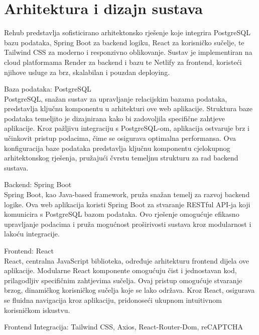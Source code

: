 \chapter{Arhitektura i dizajn sustava}

Rehub predstavlja sofisticirano arhitektonsko rješenje koje integrira PostgreSQL bazu podataka, Spring Boot za backend logiku, React za korisničko sučelje, te Tailwind CSS za moderno i responzivno oblikovanje. Sustav je implementiran na cloud platformama Render za backend i bazu te Netlify za frontend, koristeći njihove usluge za brz, skalabilan i pouzdan deploying.\\

\begin{packed_item}
	\large \item Baza podataka: PostgreSQL \normalsize \\
	PostgreSQL, snažan sustav za upravljanje relacijskim bazama podataka, predstavlja ključnu komponentu u arhitekturi ove web aplikacije. Struktura baze podataka temeljito je dizajnirana kako bi zadovoljila specifične zahtjeve aplikacije. Kroz pažljivu integraciju s PostgreSQL-om, aplikacija ostvaruje brz i učinkovit pristup podacima, čime se osigurava optimalna performansa. Ova konfiguracija baze podataka predstavlja ključnu komponentu cjelokupnog arhitektonskog rješenja, pružajući čvrstu temeljnu strukturu za rad backend sustava. \\
	\large \item Backend: Spring Boot \normalsize \\
	Spring Boot, kao Java-based framework, pruža snažan temelj za razvoj backend logike. Ova web aplikacija koristi Spring Boot za stvaranje RESTful API-ja koji komunicira s PostgreSQL bazom podataka. Ovo rješenje omogućuje efikasno upravljanje podacima i pruža mogućnost proširivosti sustava kroz modularnost i lakoću integracije. \\
	\large \item Frontend: React \normalsize \\
	React, centralna JavaScript biblioteka, određuje arhitekturu frontend dijela ove aplikacije. Modularne React komponente omogućuju čist i jednostavan kod, prilagodljiv specifičnim zahtjevima sučelja. Ovaj pristup omogućuje stvaranje brzog, dinamičkog korisničkog sučelja koje se lako održava. Kroz React, osigurava se fluidna navigacija kroz aplikaciju, pridonoseći ukupnom intuitivnom korisničkom iskustvu. \\
	\large \item Frontend Integracija: Tailwind CSS, Axios, React-Router-Dom, reCAPTCHA \normalsize \\

\end{packed_item}
